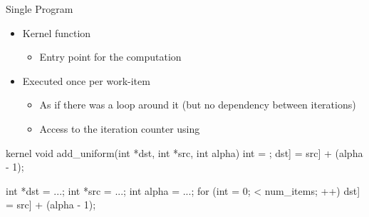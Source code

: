 


\begin{frame}[fragile]{Single Program}

\begin{itemize}
    \item Kernel function
    \begin{itemize}
        \item Entry point for the computation
    \end{itemize}
    \item Executed once per work-item
    \begin{itemize}
        \item As if there was a loop around it (but no dependency between iterations)
        \item Access to the iteration counter using \texttt{}
    \end{itemize}
\end{itemize}

\vspace{1ex}
\begin{minipage}[t]{0.45\linewidth}
\begin{codebox}[commandchars=\\\[\]]
kernel void add_uniform(int *dst,
                        int *src,
                        int alpha) {
  int \varying[tid] = ;
  dst\idx[\varying[tid]] = src\idx[\varying[tid]] + (alpha - 1);
}
\end{codebox}

\end{minipage}\hspace{1em}\begin{minipage}[t]{0.49\linewidth}
\begin{codebox}[commandchars=\\\[\]]
int *dst = ...;
int *src = ...;
int alpha = ...;
for (int \varying[tid] = 0; \varying[tid] < num_items; \varying[tid]++) {
  dst\idx[\varying[tid]] = src\idx[\varying[tid]] + (alpha - 1);
}
\end{codebox}

\end{minipage}


\end{frame}

